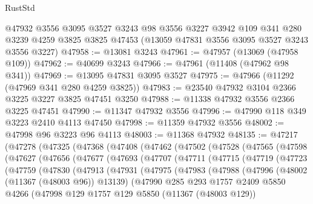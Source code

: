 \begin{lexlean}{RustStd}
\begin{coremodule}
    @47932
    @3556
    @3095
    @3527
    @3243
    @98
    @3556
    @3227
    @3942
    @109
    @341
    @280
    @3239
    @4259
    @3825
    @3825
    @47453
    (@13059 @47831 @3556 @3095 @3527 @3243 @3556 @3227)
@47958 := @13081 @3243
@47961 := @47957 (@13069 (@47958 @109))
@47962 := @40699 @3243
@47966 := @47961 (@11408 (@47962 @98 @341))
@47969 := @13095 @47831 @3095 @3527
@47975 := @47966 (@11292 (@47969 @341 @280 @4259 @3825))
@47983 := @23540 @47932 @3104 @2366 @3225 @3227 @3825 @47451 @3250
@47988 := @11338 @47932 @3556 @2366 @3225 @47451
@47990 := @11347 @47932 @3556
@47996 := @47990 @118 @349 @3223 @2410 @4113 @47450
@47998 := @11359 @47932 @3556
@48002 := @47998 @96 @3223 @96 @4113
@48003 := @11368 @47932
@48135 := @47217
    (@47278
      (@47325
        (@47368
          (@47408
            (@47462
              (@47502
                (@47528
                  (@47565
                    (@47598
                      (@47627
                        (@47656
                          (@47677
                            (@47693
                              (@47707
                                (@47711
                                  (@47715
                                    (@47719
                                      (@47723
                                        (@47759
                                          (@47830
                                            (@47913
                                              (@47931
                                                (@47975
                                                  (@47983
                                                    (@47988
                                                      (@47996
                                                        (@48002 (@11367 (@48003 @96)) @13139)
                                                        (@47990
                                                          @285
                                                          @293
                                                          @1757
                                                          @2409
                                                          @5850
                                                          @4266
                                                          (@47998
                                                            @129
                                                            @1757
                                                            @129
                                                            @5850
                                                            (@11367 (@48003 @129))

\end{coremodule}
\end{lexlean}

